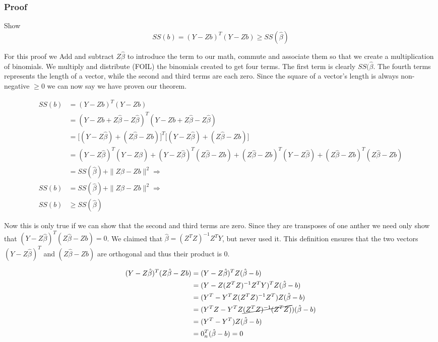 \subsubsection{Proof}
Show
\[SS(b) = (Y-Zb)^T(Y-Zb) \geq SS(\hat{\beta})\]

For this proof we Add and subtract $Z\hat{\beta}$ to introduce the term to our math,
commute and associate them so that we create a multiplication of binomials. We multiply and distribute (FOIL) the binomials created to get four terms. The first term is clearly $SS(\hat{\beta}$. The fourth terms represents the length of a vector, while the second and third terms are each zero. Since the square of a vector's length is always non-negative $\geq 0$ we can now say we have proven our theorem.


\begin{align*}
    SS(b) &= (Y-Zb)^T(Y-Zb)\\
    &= (Y-Zb+Z\hat{\beta}-Z\hat{\beta})^T(Y-Zb+Z\hat{\beta}-Z\hat{\beta})\\
    &= \Big[(Y-Z\hat{\beta})+(Z\hat{\beta}-Zb)\Big]^T
    \Big[(Y-Z\hat{\beta})+(Z\hat{\beta}-Zb)\Big] \\
    &= (Y-Z\hat{\beta})^T(Y-Z\hat{\beta})
    +(Y-Z\hat{\beta})^T(Z\hat{\beta}-Zb)
    +(Z\hat{\beta}-Zb)^T(Y-Z\hat{\beta})
    +(Z\hat{\beta}-Zb)^T(Z\hat{\beta}-Zb)\\
    &= SS(\hat{\beta}) + \|Z\hat{\beta}-Zb \|^2 \Rightarrow\\
    SS(b) &= SS(\hat{\beta}) + \|Z\hat{\beta}-Zb \|^2 \Rightarrow\\
    SS(b) &\geq SS(\hat{\beta})
\end{align*}

Now this is only true if we can show that the second and third terms are zero. Since they are transposes of one anther we need only show that $(Y-Z\hat{\beta})^T(Z\hat{\beta}-Zb) =0$. We claimed that $\hat{\beta} = (Z^TZ)^{-1}Z^TY$, but never used it. This definition ensures that the two vectors $(Y-Z\hat{\beta})^T$ and $(Z\hat{\beta}-Zb)$ are orthogonal and thus their product is 0.

\begin{align*}
  (Y-Z\hat{\beta})^T(Z\hat{\beta}-Zb) &= (Y-Z\hat{\beta})^T Z(\hat{\beta}-b)\\
  &= (Y-Z(Z^TZ)^{-1}Z^TY)^T Z(\hat{\beta}-b)\\
  &= (Y^T -Y^TZ(Z^TZ)^{-1}Z^T)Z(\hat{\beta}-b)\\
  &= (Y^TZ -Y^TZ \cancel{(Z^TZ)^{-1}(Z^TZ)})(\hat{\beta}-b)\\
  &= (Y^T-Y^T)Z(\hat{\beta}-b)\\
  &= 0_n^T  (\hat{\beta}-b) = 0
\end{align*}

